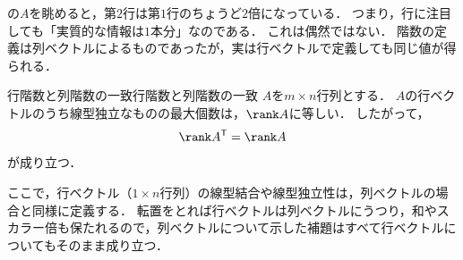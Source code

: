 の$A$を眺めると，第$2$行は第$1$行のちょうど$2$倍になっている．
つまり，行に注目しても「実質的な情報は$1$本分」なのである．
これは偶然ではない．
階数の定義は列ベクトルによるものであったが，実は行ベクトルで定義しても同じ値が得られる．

\begin{theorem}{行階数と列階数の一致}{行階数と列階数の一致}
  $A$を$m \times n$行列とする．
  $A$の行ベクトルのうち線型独立なものの最大個数は，$\rank A$に等しい．
  したがって，
  \[
    \rank A^\mathsf{T} = \rank A
  \]
  が成り立つ．
\end{theorem}

ここで，行ベクトル（$1 \times n$行列）の線型結合や線型独立性は，列ベクトルの場合と同様に定義する．
転置をとれば行ベクトルは列ベクトルにうつり，和やスカラー倍も保たれるので，列ベクトルについて示した補題はすべて行ベクトルについてもそのまま成り立つ．

